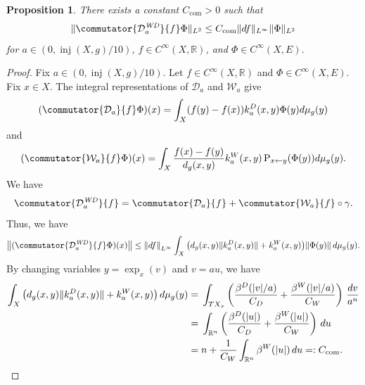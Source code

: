 \documentclass[a4paper,oneside,12pt]{amsart}
\theoremstyle{plain}
\newtheorem{proposition}[theorem]{Proposition}
\theoremstyle{definition}
\theoremstyle{remark}
\newcommand{\R}{\mathbb{R}}
\DeclarePairedDelimiter{\abs}{\lvert}{\rvert}
\DeclarePairedDelimiter{\norm}{\lVert}{\rVert}
\DeclareMathOperator{\injectivityradius}{inj}
\newcommand{\dvol}{d\mu}
\newcommand{\paralleltransport}[2]{\operatorname{P}_{#2 \gets #1}}
\newcommand{\Ltwonorm}[2][L^2]{\norm{#2}_{#1}}
\newcommand{\mesoscopicDiracoperator}[1][a]{\mathcal{D}_{#1}}
\newcommand{\mesoscopicWilsonterm}[1][a]{\mathcal{W}_{#1}}
\newcommand{\mesoscopicWilsonDiracoperator}[1][a]{\mathcal{D}_{#1}^{\mathit{WD}}}
\newcommand{\cutoff}{\beta}
\newcommand{\cutoffDirac}{\cutoff^D}
\newcommand{\cutoffWilson}{\cutoff^W}
\newcommand{\integralkernel}{k}
\newcommand{\kernelDirac}{\integralkernel_a^D}
\newcommand{\kernelWilson}{\integralkernel_a^W}
\newcommand{\constantcommutator}{C_{\mathrm{com}}}
\begin{document}
\begin{proposition}\label{proposition: commutator estimate}
  There exists a constant $\constantcommutator > 0$ such that
  \begin{equation}
    \Ltwonorm{\commutator{\mesoscopicWilsonDiracoperator}{f}\Phi} \le \constantcommutator \norm{df}_{L^{\infty}}\Ltwonorm{\Phi}
  \end{equation}
  for $a \in (0,\injectivityradius(X,g)/10)$, $f \in C^{\infty}(X,\R)$, and $\Phi \in C^{\infty}(X,E)$.
\end{proposition}
\begin{proof}
  Fix $a \in (0,\injectivityradius(X,g)/10)$.
  Let $f \in C^{\infty}(X,\R)$ and $\Phi \in C^{\infty}(X,E)$.
  Fix $x \in X$.
  The integral representations of $\mesoscopicDiracoperator$ and $\mesoscopicWilsonterm$ give
  \begin{equation}
    (\commutator{\mesoscopicDiracoperator}{f}\Phi)(x) = \int_X (f(y)-f(x)) \kernelDirac(x,y) \Phi(y) \dvol_g(y)
  \end{equation}
  and
  \begin{equation}
    (\commutator{\mesoscopicWilsonterm}{f}\Phi)(x) = \int_X \frac{f(x)-f(y)}{d_g(x,y)} \kernelWilson(x,y) \paralleltransport{y}{x}(\Phi(y)) \dvol_g(y).
  \end{equation}
  We have
  \begin{equation}
    \commutator{\mesoscopicWilsonDiracoperator}{f} = \commutator{\mesoscopicDiracoperator}{f} + \commutator{\mesoscopicWilsonterm}{f} \circ \gamma.
  \end{equation}
  Thus, we have
  \begin{equation}
    \norm*{(\commutator{\mesoscopicWilsonDiracoperator}{f}\Phi)(x)} \le \norm*{df}_{L^{\infty}} \int_X \big( d_g(x,y) \norm{\kernelDirac(x,y)} + \kernelWilson(x,y) \big) \norm{\Phi(y)} \,\dvol_g(y).
  \end{equation}
  By changing variables $y = \exp_x(v)$ and $v=au$, we have
  \begin{equation}
    \begin{aligned}
    \int_X \big( d_g(x,y) \norm{\kernelDirac(x,y)} + \kernelWilson(x,y) \big) \,\dvol_g(y) ={}& \int_{TX_x} \left( \frac{\cutoffDirac(\abs{v}/a)}{C_D} + \frac{\cutoffWilson(\abs{v}/a)}{C_W} \right) \,\frac{dv}{a^n} \\
    ={}& \int_{\R^n} \left( \frac{\cutoffDirac(\abs{u})}{C_D} + \frac{\cutoffWilson(\abs{u})}{C_W} \right) \,du \\
    ={}& n + \frac{1}{C_W}\int_{\R^n} \cutoffWilson(\abs{u}) \,du =: \constantcommutator.

\end{aligned}
\end{equation}
\end{proof}
\end{document}
